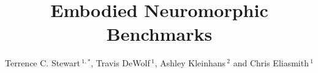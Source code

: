 \documentclass{frontiersSCNS} %
\def\firstAuthorLast{Stewart {et~al.}} %
\def\Authors{Terrence C. Stewart\,$^{1,*}$, Travis DeWolf\,$^{1}$, Ashley Kleinhans\,$^{2}$ and Chris Eliasmith\,$^1$}
\begin{document}
\onecolumn
{}

\title[Embodied Neuromorphic Benchmarks]{Embodied Neuromorphic Benchmarks} 

\author[\firstAuthorLast ]{\Authors} %
\address{} %
\correspondance{} %

\extraAuth{}%

\maketitle

\end{document}
